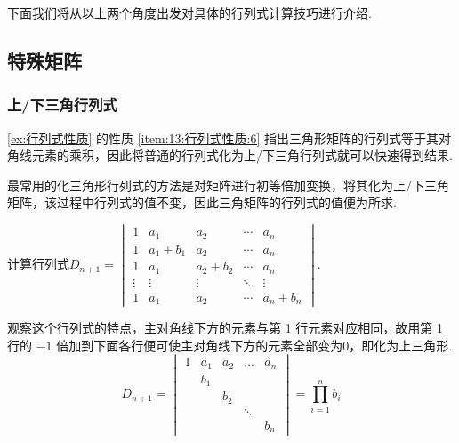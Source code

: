 下面我们将从以上两个角度出发对具体的行列式计算技巧进行介绍.

\subsection{特殊矩阵}

\subsubsection{上/下三角行列式}

\autoref{ex:行列式性质} 的性质 \ref{item:13:行列式性质:6} 指出三角形矩阵的行列式等于其对角线元素的乘积，因此将普通的行列式化为上/下三角行列式就可以快速得到结果.

最常用的化三角形行列式的方法是对矩阵进行初等倍加变换，将其化为上/下三角矩阵，该过程中行列式的值不变，因此三角矩阵的行列式的值便为所求.

\begin{example}{}{}
    计算行列式$D_{n+1}=\begin{vmatrix}
            1      & a_{1}       & a_{2}       & \cdots & a_n       \\
            1      & a_{1}+b_{1} & a_{2}       & \cdots & a_n       \\
            1      & a_{1}       & a_{2}+b_{2} & \cdots & a_n       \\
            \vdots & \vdots      & \vdots      & \ddots & \vdots    \\
            1      & a_{1}       & a_{2}       & \cdots & a_n+b_{n}
        \end{vmatrix}$.
\end{example}

\begin{solution}
    观察这个行列式的特点，主对角线下方的元素与第 1 行元素对应相同，故用第 1 行的 $-1$ 倍加到下面各行便可使主对角线下方的元素全部变为0，即化为上三角形.
    \[ D_{n+1}=\begin{vmatrix}
            1 & a_{1} & a_{2} & \ldots & a_n   \\
              & b_{1} &       &        &       \\
              &       & b_{2} &        &       \\
              &       &       & \ddots &       \\
              &       &       &        & b_{n}
        \end{vmatrix}=\prod_{i=1}^n b_i \]
\end{solution}

